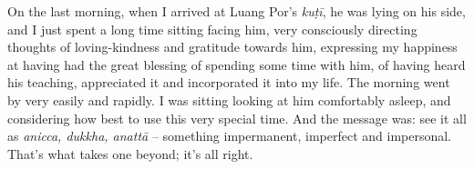 On the last morning, when I arrived at Luang Por's \emph{kuṭī}, he was
lying on his side, and I just spent a long time sitting facing him, very
consciously directing thoughts of loving-kindness and gratitude towards
him, expressing my happiness at having had the great blessing of
spending some time with him, of having heard his teaching, appreciated
it and incorporated it into my life. The morning went by very easily and
rapidly. I was sitting looking at him comfortably asleep, and
considering how best to use this very special time. And the message was: 
see it all as \emph{anicca, dukkha, anattā} -- something impermanent, imperfect
and impersonal. That's what takes one beyond; it's all right.

